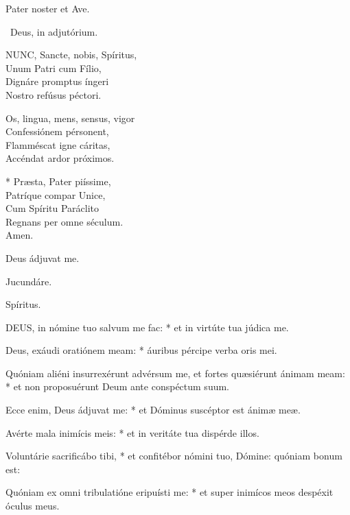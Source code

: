 
\sectionornament


Pater noster et Ave.

\V\ Deus, in adjutórium.


\lettrine[lines=2]{N}{UNC}, Sancte, nobis, Spíritus,\\
Unum Patri cum Fílio,\\
Dignáre promptus íngeri\\
Nostro refúsus péctori.

Os, lingua, mens, sensus, vigor\\
Confessiónem pérsonent,\\
Flamméscat igne cáritas,\\
Accéndat ardor próximos.

* Præsta, Pater piíssime,\\
Patríque compar Unice,\\
Cum Spíritu Paráclito\\
Regnans per omne séculum.\\
Amen.

  Deus ádjuvat me.


  Jucundáre.

  Spíritus.


\lettrine[lines=2]{D}{EUS}, in nómine tuo salvum me fac: * et in virtúte tua júdica me.

Deus, exáudi oratiónem meam: * áuribus pércipe verba oris mei.

Quóniam aliéni insurrexérunt advérsum me, et fortes quæsiérunt ánimam meam: * et non proposuérunt Deum ante conspéctum suum.

Ecce enim, Deus ádjuvat me: * et Dóminus suscéptor est ánimæ meæ.

Avérte mala inimícis meis: * et in veritáte tua dispérde illos.

Voluntárie sacrificábo tibi, * et confitébor nómini tuo, Dómine: quóniam bonum est:

Quóniam ex omni tribulatióne eripuísti me: * et super inimícos meos despéxit óculus meus.

